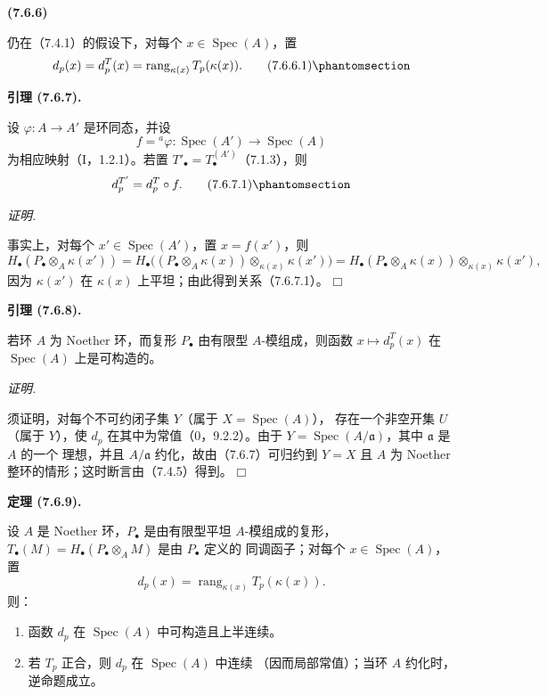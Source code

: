 \documentclass[UTF8,fontset=none,11pt,oneside,openany]{ctexbook}
\providecommand{\square}{\mdlgwhtsquare}
\newenvironment{env}[1][]{%
  \par\medskip\noindent\textbf{(#1)}\ %
}{\par}
\newenvironment{lemma}[1][]{%
  \par\medskip\noindent\textbf{引理 (#1).}\ %
}{\par}
\newenvironment{theorem}[1][]{%
  \par\medskip\noindent\textbf{定理 (#1).}\ %
}{\par}
\newenvironment{proof}{%
  \par\smallskip\noindent\textit{证明.}\ %
}{\hfill$\square$\par}
\newcommand{\oldpage}[2][]{%
  \hypertarget{ega-source-page-#1-#2}{}%
  \marginnote{\scriptsize\textbf{#1}~|~#2}\ignorespaces}
\let\EGAOriginalLabel\label
\renewcommand{\label}[1]{\phantomsection\EGAOriginalLabel{#1}}
\begin{document}
\begin{env}[7.6.6]
仍在（7.4.1）的假设下，对每个 $x\in\operatorname{Spec}(A)$，置
\[
  d_p(x)=d_p^T(x)=\operatorname{rang}_{\kappa(x)}T_p(\kappa(x)).
  \tag{7.6.6.1}\label{III.7.6.6.1.fr}
\]
\end{env}

\begin{lemma}[7.6.7]
设 $\varphi:A\to A'$ 是环同态，并设
\[
  f={}^a\!\varphi:
  \operatorname{Spec}(A')\longrightarrow\operatorname{Spec}(A)
\]
为相应映射（I，1.2.1）。若置 $T'_\bullet=T_\bullet^{(A')}$（7.1.3），则
\[
  d_p^{T'}=d_p^T\circ f.
  \tag{7.6.7.1}\label{III.7.6.7.1.fr}
\]
\end{lemma}

\begin{proof}
\oldpage[III]{195}
事实上，对每个 $x'\in\operatorname{Spec}(A')$，置 $x=f(x')$，则
\[
  H_\bullet(P_\bullet\otimes_A\kappa(x'))
  =
  H_\bullet\bigl((P_\bullet\otimes_A\kappa(x))
    \otimes_{\kappa(x)}\kappa(x')\bigr)
  =
  H_\bullet(P_\bullet\otimes_A\kappa(x))
    \otimes_{\kappa(x)}\kappa(x'),
\]
因为 $\kappa(x')$ 在 $\kappa(x)$ 上平坦；由此得到关系（7.6.7.1）。
\end{proof}

\begin{lemma}[7.6.8]
若环 $A$ 为 Noether 环，而复形 $P_\bullet$ 由有限型 $A$-模组成，则函数
$x\mapsto d_p^T(x)$ 在 $\operatorname{Spec}(A)$ 上是可构造的。
\end{lemma}

\begin{proof}
须证明，对每个不可约闭子集 $Y$（属于 $X=\operatorname{Spec}(A)$），
存在一个非空开集 $U$（属于 $Y$），使 $d_p$ 在其中为常值（$0$，9.2.2）。由于
$Y=\operatorname{Spec}(A/\mathfrak a)$，其中 $\mathfrak a$ 是 $A$ 的一个
理想，并且 $A/\mathfrak a$ 约化，故由（7.6.7）可归约到 $Y=X$ 且 $A$
为 Noether 整环的情形；这时断言由（7.4.5）得到。
\end{proof}

\begin{theorem}[7.6.9]
设 $A$ 是 Noether 环，$P_\bullet$ 是由有限型平坦 $A$-模组成的复形，
$T_\bullet(M)=H_\bullet(P_\bullet\otimes_A M)$ 是由 $P_\bullet$ 定义的
同调函子；对每个 $x\in\operatorname{Spec}(A)$，置
\[
  d_p(x)=\operatorname{rang}_{\kappa(x)}T_p(\kappa(x)).
\]
则：
\begin{enumerate}
  \item[(i)] 函数 $d_p$ 在 $\operatorname{Spec}(A)$ 中可构造且上半连续。
  \item[(ii)] 若 $T_p$ 正合，则 $d_p$ 在 $\operatorname{Spec}(A)$ 中连续
    （因而局部常值）；当环 $A$ 约化时，逆命题成立。
\end{enumerate}
\end{theorem}
\end{document}
